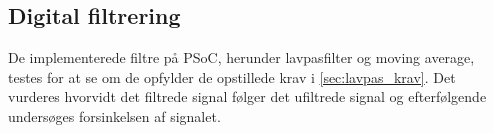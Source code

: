 \subsection{Digital filtrering}
De implementerede filtre på PSoC, herunder lavpasfilter og moving average, testes for at se om de opfylder de opstillede krav i \autoref{sec:lavpas_krav}. Det vurderes hvorvidt det filtrede signal følger det ufiltrede signal og efterfølgende undersøges forsinkelsen af signalet. 